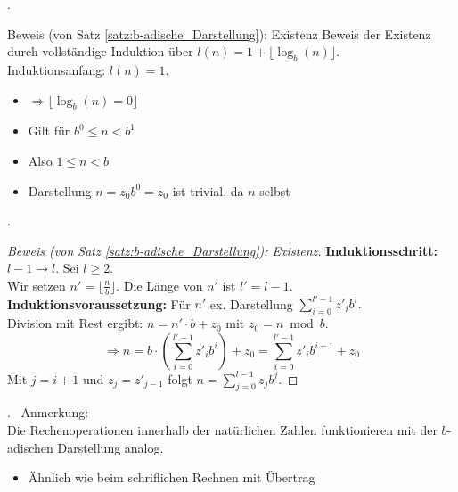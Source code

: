 \documentclass{beamer}
\newcommand{\subsecframe}{\begin{frame}{\insertsectionnumber.\insertsubsectionnumber \ \insertsubsection}}
\begin{document}
        \subsecframe
            \begin{block}{Beweis (von Satz \ref{satz:b-adische_Darstellung}): Existenz}
                Beweis der Existenz durch vollständige Induktion über $l(n) = 1 + \lfloor \log_b(n) \rfloor$. \\
                \vspace{\baselineskip}
                Induktionsanfang: $l(n) = 1$.
                \begin{itemize}
                    \item $\Rightarrow \lfloor \log_b(n) = 0 \rfloor$
                    \item Gilt für $b^0 \leq n < b^1$
                    \item Also $1 \leq n < b$
                    \item Darstellung $n = z_0 b^0 = z_0$ ist trivial, da $n$ selbst
                \end{itemize}
            \end{block}
        \end{frame}

        \subsecframe
            \begin{proof}[Beweis (von Satz \ref{satz:b-adische_Darstellung}): Existenz]
                \textbf{Induktionsschritt:} $l-1 \to l$. Sei $l \geq 2$. \\
                Wir setzen $n' = \lfloor \frac{n}{b} \rfloor.$
                Die Länge von $n'$ ist $l' = l-1$. \\
                \vspace{\baselineskip}
                \textbf{Induktionsvoraussetzung:} Für $n'$ ex. Darstellung $\displaystyle\sum_{i=0}^{l'-1} z'_i b^i.$ \\
                Division mit Rest ergibt: $n = n' \cdot b + z_0$ mit $z_0 = n \bmod b$. \\
                \[\Rightarrow n = b \cdot \left( \sum_{i=0}^{l'-1} z'_i b^i \right) + z_0 = \sum_{i=0}^{l'-1} z'_i b^{i+1} + z_0\] 
                Mit $j= i+1$ und $z_j = z'_{j-1}$ folgt $n = \displaystyle\sum_{j=0}^{l-1}z_jb^j.$
            \end{proof}
        \end{frame}

        \subsecframe
            Anmerkung: \\
            Die Rechenoperationen innerhalb der natürlichen Zahlen funktionieren mit der $b$-adischen Darstellung analog.
            \begin{itemize}
                \item Ähnlich wie beim schriflichen Rechnen mit Übertrag
            \end{itemize}
        \end{frame}
\end{document}
